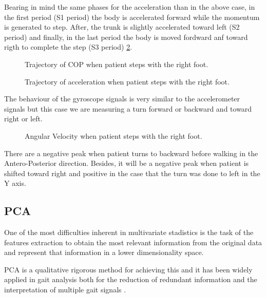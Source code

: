 Bearing in mind the same phases for the acceleration than in the above case, in the first period (S1 period) the body is accelerated forward while the momentum is generated to step. After, the trunk is slightly accelerated toward left (S2 period) and finally, in the last period the body is moved fordward anf toward rigth to complete the step (S3 period) \ref{fig:trajectoryAcc}.  

\begin{figure}[H]
	\centering
	\caption{Trajectory of COP when patient steps with the right foot.}
	\label{fig:trajectoryCOP}
\end{figure} 
                 
\begin{figure}[H]
	\centering
	\caption{Trajectory of acceleration when patient steps with the right foot.}
	\label{fig:trajectoryAcc}
\end{figure} 

The behaviour of the gyroscope signals is very similar to the accelerometer signals but this case we are measuring a turn forward or backward and toward right or left. 

\begin{figure}[H]
	\centering
	\caption{Angular Velocity when patient steps with the right foot.}
	\label{fig:GyroTrunk}
\end{figure} 

There are a negative peak when patient turns to backward before walking in the Antero-Posterior direction. Besides, it will be a negative peak when patient is shifted toward right and positive in the case that the turn was done to left in the Y axis.


\subsection{PCA}
One of the most difficulties inherent in multivariate stadistics is the task of the features extraction to obtain the most relevant information from the original data and represent that information in a lower dimensionality space.

PCA is a qualitative rigorous method for achieving this and it has been widely applied in gait analysis both for the reduction of redundant information and the interpretation of multiple gait signals \cite{PCA}.

